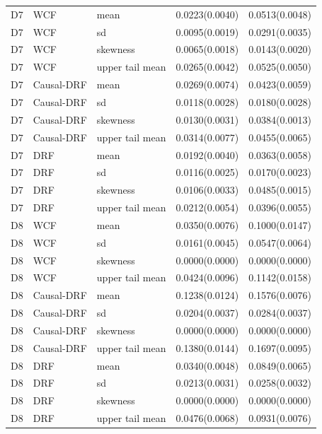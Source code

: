 \begin{longtable}{lllrr}
D7 & WCF & mean & 0.0223(0.0040) & 0.0513(0.0048) \\
D7 & WCF & sd & 0.0095(0.0019) & 0.0291(0.0035) \\
D7 & WCF & skewness & 0.0065(0.0018) & 0.0143(0.0020) \\
D7 & WCF & upper tail mean & 0.0265(0.0042) & 0.0525(0.0050) \\
D7 & Causal-DRF & mean & 0.0269(0.0074) & 0.0423(0.0059) \\
D7 & Causal-DRF & sd & 0.0118(0.0028) & 0.0180(0.0028) \\
D7 & Causal-DRF & skewness & 0.0130(0.0031) & 0.0384(0.0013) \\
D7 & Causal-DRF & upper tail mean & 0.0314(0.0077) & 0.0455(0.0065) \\
D7 & DRF & mean & 0.0192(0.0040) & 0.0363(0.0058) \\
D7 & DRF & sd & 0.0116(0.0025) & 0.0170(0.0023) \\
D7 & DRF & skewness & 0.0106(0.0033) & 0.0485(0.0015) \\
D7 & DRF & upper tail mean & 0.0212(0.0054) & 0.0396(0.0055) \\
D8 & WCF & mean & 0.0350(0.0076) & 0.1000(0.0147) \\
D8 & WCF & sd & 0.0161(0.0045) & 0.0547(0.0064) \\
D8 & WCF & skewness & 0.0000(0.0000) & 0.0000(0.0000) \\
D8 & WCF & upper tail mean & 0.0424(0.0096) & 0.1142(0.0158) \\
D8 & Causal-DRF & mean & 0.1238(0.0124) & 0.1576(0.0076) \\
D8 & Causal-DRF & sd & 0.0204(0.0037) & 0.0284(0.0037) \\
D8 & Causal-DRF & skewness & 0.0000(0.0000) & 0.0000(0.0000) \\
D8 & Causal-DRF & upper tail mean & 0.1380(0.0144) & 0.1697(0.0095) \\
D8 & DRF & mean & 0.0340(0.0048) & 0.0849(0.0065) \\
D8 & DRF & sd & 0.0213(0.0031) & 0.0258(0.0032) \\
D8 & DRF & skewness & 0.0000(0.0000) & 0.0000(0.0000) \\
D8 & DRF & upper tail mean & 0.0476(0.0068) & 0.0931(0.0076) \\
\bottomrule
\end{longtable}
\endgroup

